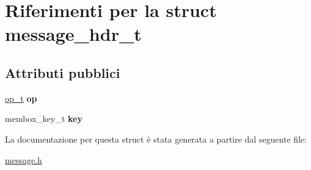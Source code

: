 \hypertarget{structmessage__hdr__t}{}\section{Riferimenti per la struct message\+\_\+hdr\+\_\+t}
\label{structmessage__hdr__t}
\subsection*{Attributi pubblici}
\begin{DoxyCompactItemize}
\item 
\hyperlink{ops_8h_ac6fa1b34da8872e34c2936391332f44c}{op\+\_\+t} {\bfseries op}\hypertarget{structmessage__hdr__t_ab7f4eacc8e900cca79b63ddfb02d67fd}{}\label{structmessage__hdr__t_ab7f4eacc8e900cca79b63ddfb02d67fd}

\item 
membox\+\_\+key\+\_\+t {\bfseries key}\hypertarget{structmessage__hdr__t_a683fe6c1599d9e0edcc5dbd10fda0545}{}\label{structmessage__hdr__t_a683fe6c1599d9e0edcc5dbd10fda0545}

\end{DoxyCompactItemize}


La documentazione per questa struct è stata generata a partire dal seguente file\+:\begin{DoxyCompactItemize}
\item 
\hyperlink{message_8h}{message.\+h}\end{DoxyCompactItemize}
